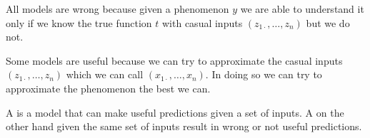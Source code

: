 \documentclass[12pt]{article}
\begin{document}
\begin{enumerate}

All models are wrong because given a phenomenon $y$ we are able to understand it only if we know the true function $t$ with casual inputs $(z_{1 \cdot}, \ldots, z _{n})$ but we do not.


Some models are useful because we can try to approximate the casual inputs $(z_{1 \cdot}, \ldots, z _{n})$
which we can call $(x_{1 \cdot}, \ldots, x _{n})$. In doing so we can try to approximate the phenomenon the best we can. 


A  is a model that can make useful predictions given a set of inputs. A  on the other hand given the same set of inputs result in wrong or not useful predictions. 
\end{enumerate}

\end{document}
